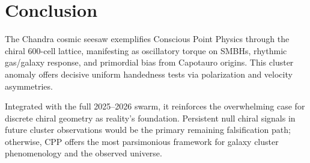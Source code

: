 \documentclass[11pt]{article}
\begin{document}
\section{Conclusion}
The Chandra cosmic seesaw exemplifies Conscious Point Physics through the chiral 600-cell lattice, manifesting as oscillatory torque on SMBHs, rhythmic gas/galaxy response, and primordial bias from Capotauro origins. This cluster anomaly offers decisive uniform handedness tests via polarization and velocity asymmetries.  

Integrated with the full 2025--2026 swarm, it reinforces the overwhelming case for discrete chiral geometry as reality's foundation. Persistent null chiral signals in future cluster observations would be the primary remaining falsification path; otherwise, CPP offers the most parsimonious framework for galaxy cluster phenomenology and the observed universe.
\end{document}
